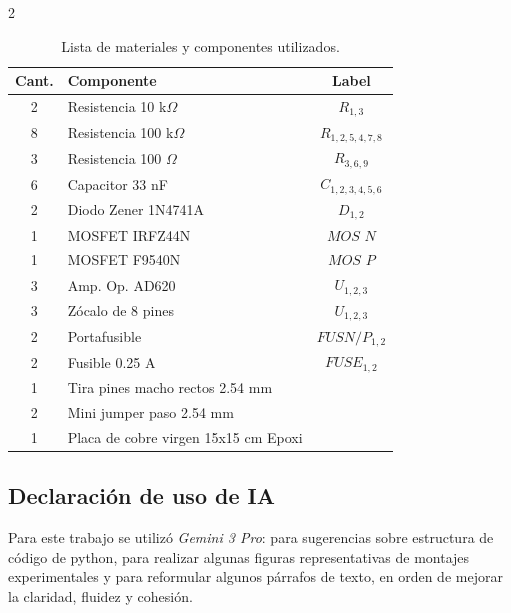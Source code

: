 \documentclass[11pt,letterpaper]{article}
\renewcommand{\bibfont}{\normalfont\normalsize} %
\begin{document}
\begin{multicols*}{2}
\begin{table}[H]
    \centering
    \caption{\label{tab: componentes electronicos}Lista de materiales y componentes utilizados.}
    \begin{tabularx}{\linewidth}{c X c} 
        \toprule
        \textbf{Cant.} & \textbf{Componente} & \textbf{Label} \\
        \midrule
        2 & Resistencia 10 k$\Omega$ & $R_{1,3}$\\
        8 & Resistencia 100 k$\Omega$ & $R_{1,2,5,4,7,8}$\\
        3 & Resistencia 100 $\Omega$ & $R_{3,6,9}$\\
        6 & Capacitor 33 nF & $C_{1,2,3,4,5,6}$\\
        2 & Diodo Zener 1N4741A & $D_{1,2}$\\
        1 & MOSFET IRFZ44N & $MOS$ $N$\\
        1 & MOSFET F9540N & $MOS$ $P$\\
        3 & Amp. Op. AD620 & $U_{1,2,3}$\\
        3 & Zócalo de 8 pines & $U_{1,2,3}$\\
        2 & Portafusible & $FUSN/P_{1,2}$\\
        2 & Fusible 0.25 A & $FUSE_{1,2}$\\
        1 & Tira pines macho rectos 2.54 mm & \\
        2 & Mini jumper paso 2.54 mm & \\
        1 & Placa de cobre virgen 15x15 cm Epoxi & \\
        \bottomrule
    \end{tabularx}
\end{table}


\subsection*{Declaración de uso de IA}

Para este trabajo se utilizó \textit{Gemini 3 Pro}: para sugerencias sobre estructura de código de python, para realizar algunas figuras representativas de montajes experimentales y para reformular algunos párrafos de texto, en orden de mejorar la claridad, fluidez y cohesión.

\begingroup
    \raggedright  %
    \renewcommand{\bibfont}{\small}
    \printbibliography
\endgroup


\end{multicols*}
\end{document}
